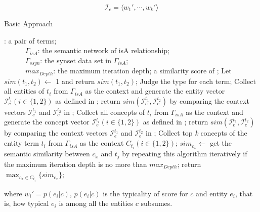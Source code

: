 %
\begin{equation}
\label{eq:Ic}
  \mathcal{I}_c = \langle w_1',\cdots,w_k' \rangle
\end{equation}
\renewcommand\algorithmicrequire{\textbf{Input:}}
\renewcommand\algorithmicensure {\textbf{Output:}}
\begin{algorithm}[!t]
\caption{Basic Approach}
\label{alg:baseline}
\begin{algorithmic}[1]
\REQUIRE {}: a pair of terms;\\
~~~~~~$\Gamma_{isA}$: the semantic network of isA relationship;\\
~~~~~~$\Gamma_{ssyn}$: the synset data set in $\Gamma_{isA}$;\\
~~~~~~$max_{Depth}$: the maximum iteration depth;
\ENSURE a similarity score of ;
\STATE Let $sim(t_1, t_2) \leftarrow $ 1 and return $sim(t_1, t_2)$;
\ENDIF
\STATE Judge the type for each term;
\STATE Collect all entities of $t_i$ from $\Gamma_{isA}$ as the context and generate the entity vector $\mathcal{I}_c^{t_i}(i\in\{1, 2\})$ as defined in ;
\STATE return $sim(\mathcal{I}_c^{t_1}, \mathcal{I}_c^{t_2})$ by comparing the context vectors $\mathcal{I}_c^{t_1}$ and $\mathcal{I}_c^{t_2}$ in ;
\ENDIF
{}
\STATE Collect all concepts of $t_i$ from $\Gamma_{isA}$ as the context and generate the concept vector $\mathcal{I}_e^{t_i}(i\in\{1, 2\})$ as defined in ;
\STATE return $sim(\mathcal{I}_e^{t_1}, \mathcal{I}_e^{t_2})$ by comparing the context vectors $\mathcal{I}_e^{t_1}$ and $\mathcal{I}_e^{t_2}$ in ;
\ENDIF
{}
\STATE Collect top \emph{k} concepts of the entity term $t_i$ from $\Gamma_{isA}$ as the context $C_{t_i} (i\in\{1, 2\})$;
\STATE $sim_{c_x}\leftarrow$ get the semantic similarity between $c_x$ and $t_j$ by repeating this algorithm iteratively if the maximum iteration depth is no more than $max_{Depth}$;%
\ENDFOR
\STATE return $\max_{c_x\in C_{t_i}}\{sim_{c_x}\}$;
\ENDIF
\end{algorithmic}
\end{algorithm}
{\noindent where $w_i' = p(e_i|c)$, $p(e_i|c)$ is the
typicality of score for $c$ and entity $e_i$, that is, how typical
$e_i$ is among all the entities $c$ subsumes.}

